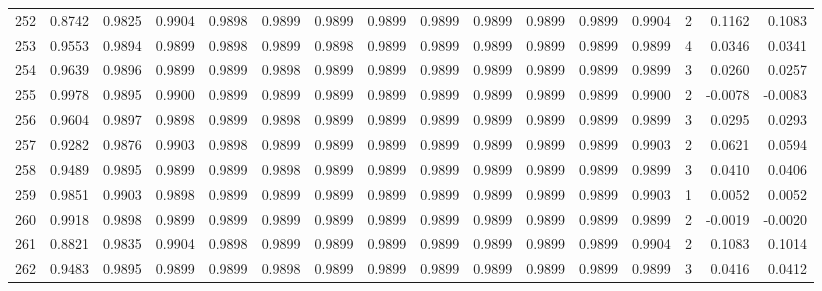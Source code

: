 \begin{tabular}{lrrrrrrrrrrrrrrr}
252 &      0.8742 &  0.9825 &  0.9904 &  0.9898 &  0.9899 &  0.9899 &  0.9899 &  0.9899 &  0.9899 &  0.9899 &   0.9899 &     0.9904 &      2 &                    0.1162 &                     0.1083 \\
253 &      0.9553 &  0.9894 &  0.9899 &  0.9898 &  0.9899 &  0.9898 &  0.9899 &  0.9899 &  0.9899 &  0.9899 &   0.9899 &     0.9899 &      4 &                    0.0346 &                     0.0341 \\
254 &      0.9639 &  0.9896 &  0.9899 &  0.9899 &  0.9898 &  0.9899 &  0.9899 &  0.9899 &  0.9899 &  0.9899 &   0.9899 &     0.9899 &      3 &                    0.0260 &                     0.0257 \\
255 &      0.9978 &  0.9895 &  0.9900 &  0.9899 &  0.9899 &  0.9899 &  0.9899 &  0.9899 &  0.9899 &  0.9899 &   0.9899 &     0.9900 &      2 &                   -0.0078 &                    -0.0083 \\
256 &      0.9604 &  0.9897 &  0.9898 &  0.9899 &  0.9898 &  0.9899 &  0.9899 &  0.9899 &  0.9899 &  0.9899 &   0.9899 &     0.9899 &      3 &                    0.0295 &                     0.0293 \\
257 &      0.9282 &  0.9876 &  0.9903 &  0.9898 &  0.9899 &  0.9899 &  0.9899 &  0.9899 &  0.9899 &  0.9899 &   0.9899 &     0.9903 &      2 &                    0.0621 &                     0.0594 \\
258 &      0.9489 &  0.9895 &  0.9899 &  0.9899 &  0.9898 &  0.9899 &  0.9899 &  0.9899 &  0.9899 &  0.9899 &   0.9899 &     0.9899 &      3 &                    0.0410 &                     0.0406 \\
259 &      0.9851 &  0.9903 &  0.9898 &  0.9899 &  0.9899 &  0.9899 &  0.9899 &  0.9899 &  0.9899 &  0.9899 &   0.9899 &     0.9903 &      1 &                    0.0052 &                     0.0052 \\
260 &      0.9918 &  0.9898 &  0.9899 &  0.9899 &  0.9899 &  0.9899 &  0.9899 &  0.9899 &  0.9899 &  0.9899 &   0.9899 &     0.9899 &      2 &                   -0.0019 &                    -0.0020 \\
261 &      0.8821 &  0.9835 &  0.9904 &  0.9898 &  0.9899 &  0.9899 &  0.9899 &  0.9899 &  0.9899 &  0.9899 &   0.9899 &     0.9904 &      2 &                    0.1083 &                     0.1014 \\
262 &      0.9483 &  0.9895 &  0.9899 &  0.9899 &  0.9898 &  0.9899 &  0.9899 &  0.9899 &  0.9899 &  0.9899 &   0.9899 &     0.9899 &      3 &                    0.0416 &                     0.0412 \\

\end{tabular}
